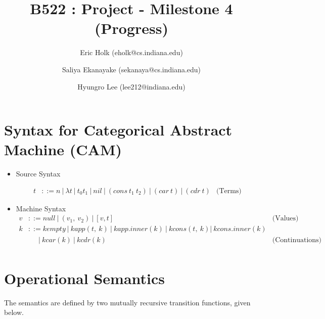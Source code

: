 \documentclass{article}
\title{B522 : Project - Milestone 4 (Progress)}
\author{Eric Holk (eholk@cs.indiana.edu) \and Saliya Ekanayake (sekanaya@cs.indiana.edu) \and Hyungro Lee (lee212@indiana.edu)}
\begin{document}
\maketitle

\newcommand{\cons}{\ensuremath{\mathtt{cons}}}
\newcommand{\car}{\ensuremath{\mathtt{car}}}
\newcommand{\cdr}{\ensuremath{\mathtt{cdr}}}
\newcommand{\vnull}{\ensuremath{\mathtt{null}}}
\newcommand{\nil}{\ensuremath{\mathtt{nil}}}
\newcommand{\nils}{\ensuremath{\mathit{nil}}}
\newcommand{\addone}{\ensuremath{\mathtt{add1}}}
\newcommand{\gap}{\ensuremath{\quad}}

\section{Syntax for Categorical Abstract Machine (CAM)}

\begin{itemize}

\item Source Syntax

\[
\begin{array}{rlr}
  t & ::= n ~| ~\lambda t ~| ~t_0 t_1 ~| ~nil ~| ~(cons ~t_1 ~t_2) ~| ~(car ~t)
  ~| ~(cdr ~t) & \textrm{(Terms)}
\end{array}
\]


\item Machine Syntax
\[
\begin{array}{rlr}
v & ::= null ~| ~(v_1, ~v_2) ~| ~[v, t] & \textrm{(Values)} \\
k & ::= kempty ~| ~kapp(t, ~k) ~| ~kapp.inner(k) ~| ~kcons(t, ~k) | ~kcons.inner(k) \\
& \gap ~~| ~kcar(k) ~| ~kcdr(k) & \textrm{(Continuations)} \\
\end{array}
\]

\end{itemize}

\section{Operational Semantics}

The semantics are defined by two mutually recursive transition
functions, given below.
\end{document}
